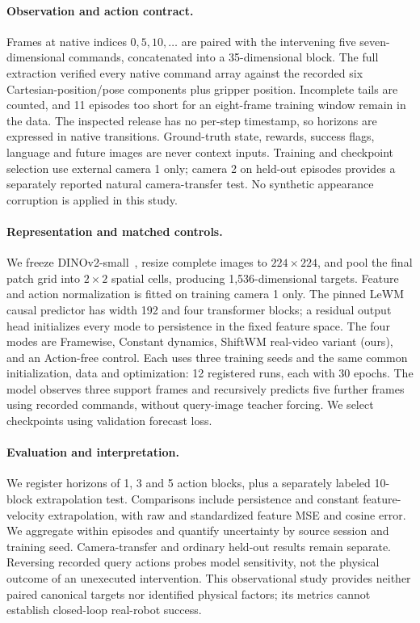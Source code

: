 \paragraph{Observation and action contract.}
Frames at native indices $0,5,10,\ldots$ are paired with the intervening five
seven-dimensional commands, concatenated into a 35-dimensional block.
The full extraction verified every native command array against the recorded
six Cartesian-position/pose components plus gripper position.
Incomplete tails are counted, and 11 episodes too short for an eight-frame
training window remain in the data. The inspected release has no per-step timestamp,
so horizons are expressed in native transitions. Ground-truth state, rewards,
success flags, language and future images are never context inputs.
Training and checkpoint selection use external camera 1 only; camera 2 on
held-out episodes provides a separately reported natural camera-transfer test.
No synthetic appearance corruption is applied in this study.

\paragraph{Representation and matched controls.}
We freeze DINOv2-small~\citep{oquab2023dinov2}, resize complete images to
$224\!\times\!224$, and pool the final patch grid into $2\!\times\!2$ spatial
cells, producing 1,536-dimensional targets. Feature and action normalization
is fitted on training camera 1 only. The pinned LeWM causal predictor
\citep{maes2026lewm} has width 192 and four transformer blocks; a residual
output head initializes every mode to persistence in the fixed feature space.
The four modes are Framewise, Constant dynamics, ShiftWM real-video variant
(ours), and an Action-free control. Each uses three training seeds and the
same common initialization, data and optimization: 12 registered runs, each
with 30 epochs. The model observes three support frames and recursively
predicts five further frames using recorded commands, without query-image
teacher forcing. We select checkpoints using validation forecast loss.

\paragraph{Evaluation and interpretation.}
We register horizons of 1, 3 and 5 action blocks, plus a separately labeled
10-block extrapolation test. Comparisons include persistence and constant
feature-velocity extrapolation, with raw and standardized feature MSE and
cosine error. We aggregate within episodes and quantify uncertainty by source
session and training seed. Camera-transfer and ordinary held-out results
remain separate. Reversing recorded query actions probes model sensitivity,
not the physical outcome of an unexecuted intervention. This observational
study provides neither paired canonical targets nor identified physical
factors; its metrics cannot establish closed-loop real-robot success.

